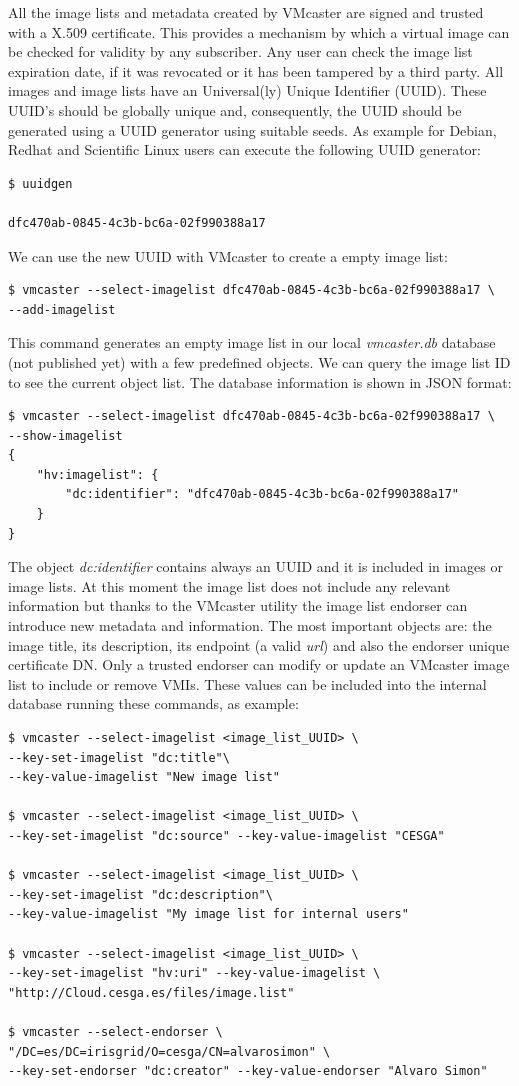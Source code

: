 \documentclass{cai}
\begin{document}
All the image lists and metadata created by VMcaster are signed and trusted with a X.509 certificate.
This provides a mechanism by which a virtual image can be checked for validity by any subscriber. Any user can check the image list expiration date, if it was revocated or it has been tampered by a third party.
All images and image lists have an Universal(ly) Unique Identifier (UUID). These UUID's should be globally unique and, consequently, the UUID should be generated using a UUID generator using suitable seeds. As example for Debian, Redhat and Scientific Linux users can execute the following UUID generator:
\begin{verbatim}
$ uuidgen

dfc470ab-0845-4c3b-bc6a-02f990388a17
\end{verbatim}
We can use the new UUID with VMcaster to create a empty image list:
\begin{verbatim}
$ vmcaster --select-imagelist dfc470ab-0845-4c3b-bc6a-02f990388a17 \
--add-imagelist
\end{verbatim}
This command generates an empty image list in our local \textit{vmcaster.db} database (not published yet) with a few predefined objects. We can query the image list ID to see the current object list.
The database information is shown in JSON format:
\begin{verbatim}
$ vmcaster --select-imagelist dfc470ab-0845-4c3b-bc6a-02f990388a17 \
--show-imagelist
{
    "hv:imagelist": {
        "dc:identifier": "dfc470ab-0845-4c3b-bc6a-02f990388a17"
    }
}
\end{verbatim}
The object \textit{dc:identifier} contains always an UUID and it is included in images or image lists. 
At this moment the image list does not include any relevant information but thanks to the VMcaster utility the image list endorser can introduce new metadata and information.
The most important objects are: the image title, its description, its endpoint (a valid \textit{url}) and also the endorser unique certificate DN. Only a trusted endorser can modify or update an VMcaster image list to include or remove VMIs. 
These values can be included into the internal database running these commands, as example:
\begin{verbatim}
$ vmcaster --select-imagelist <image_list_UUID> \
--key-set-imagelist "dc:title"\ 
--key-value-imagelist "New image list"

$ vmcaster --select-imagelist <image_list_UUID> \ 
--key-set-imagelist "dc:source" --key-value-imagelist "CESGA"

$ vmcaster --select-imagelist <image_list_UUID> \ 
--key-set-imagelist "dc:description"\ 
--key-value-imagelist "My image list for internal users"

$ vmcaster --select-imagelist <image_list_UUID> \ 
--key-set-imagelist "hv:uri" --key-value-imagelist \ 
"http://Cloud.cesga.es/files/image.list"

$ vmcaster --select-endorser \ 
"/DC=es/DC=irisgrid/O=cesga/CN=alvarosimon" \
--key-set-endorser "dc:creator" --key-value-endorser "Alvaro Simon"
\end{verbatim}
\end{document}
